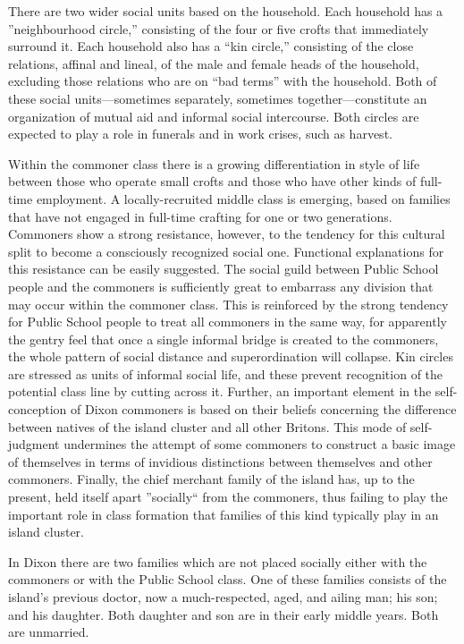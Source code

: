\documentclass[openany,nobib]{tufte-book}
\begin{document}
There are two wider social units based on the household. Each household
has a ''neighbourhood circle,'' consisting of the four or five crofts
that immediately surround it. Each household also has a ``kin circle,''
consisting of the close relations, affinal and lineal, of the male and
female heads of the household, excluding those relations who are on
``bad terms'' with the household. Both of these social units---sometimes
separately, sometimes together---constitute an organization of mutual
aid and informal social intercourse. Both circles are expected to play a
role in funerals and in work crises, such as harvest.

Within the commoner class there is a growing differentiation in style of
life between those who operate small crofts and those who have other
kinds of full-time employment. A locally-recruited middle class is
emerging, based on families that have not engaged in full-time crafting
for one or two generations. Commoners show a strong resistance, however,
to the tendency for this cultural split to become a consciously
recognized social one. Functional explanations for this resistance can
be easily suggested. The social guild between Public School people and
the commoners is sufficiently great to embarrass any division that may
occur within the commoner class. This is reinforced by the strong
tendency for Public School people to treat all commoners in the same
way, for apparently the gentry feel that once a single informal bridge
is created to the commoners, the whole pattern of social distance and
superordination will collapse. Kin circles are stressed as units of
informal social life, and these prevent recognition of the potential
class line by cutting across it. Further, an important element in the
self-conception of Dixon commoners is based on their beliefs concerning
the difference between natives of the island cluster and all other
Britons. This mode of self-judgment undermines the attempt of some
commoners to construct a basic image of themselves in terms of invidious
distinctions between themselves and other commoners. Finally, the chief
merchant family of the island has, up to the present, held itself apart
''socially`` from the commoners, thus failing to play the important role
in class formation that families of this kind typically play in an
island cluster.

In Dixon there are two families which are not placed socially either
with the commoners or with the Public School class. One of these
families consists of the island's previous doctor, now a much-respected,
aged, and ailing man; his son; and his daughter. Both daughter and son
are in their early middle years. Both are unmarried.
\end{document}
